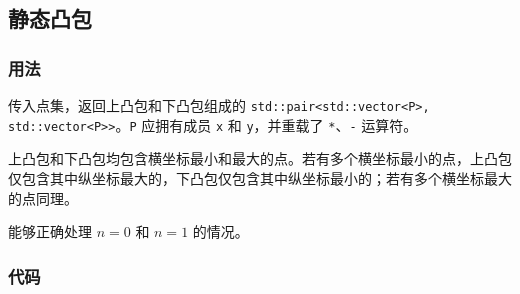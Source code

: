 \subsection{静态凸包}

\subsubsection{用法}

传入点集，返回上凸包和下凸包组成的 \lstinline{std::pair<std::vector<P>, std::vector<P>>}。\lstinline{P} 应拥有成员 \lstinline{x} 和 \lstinline{y}，并重载了 \lstinline{*}、\lstinline{-} 运算符。

上凸包和下凸包均包含横坐标最小和最大的点。若有多个横坐标最小的点，上凸包仅包含其中纵坐标最大的，下凸包仅包含其中纵坐标最小的；若有多个横坐标最大的点同理。

能够正确处理 $n = 0$ 和 $n = 1$ 的情况。

\subsubsection{代码}


